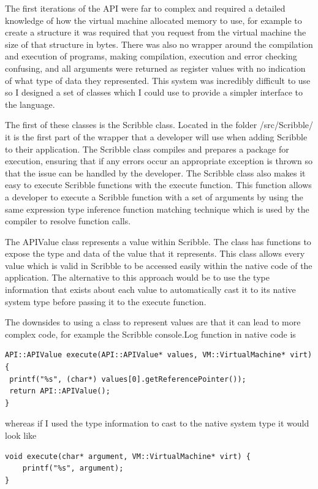 \documentclass[]{final_report}
\begin{document}
The first iterations of the API were far to complex and required a detailed knowledge of how the virtual machine allocated memory to use, for example to create a structure it was required that you request from the virtual machine the size of that structure in bytes. There was also no wrapper around the compilation and execution of programs, making compilation, execution and error checking confusing, and all arguments were returned as register values with no indication of what type of data they represented. This system was incredibly difficult to use so I designed a set of classes which I could use to provide a simpler interface to the language.

The first of these classes is the Scribble class. Located in the folder /src/Scribble/ it is the first part of the wrapper that a developer will use when adding Scribble to their application. The Scribble class compiles and prepares a package for execution, ensuring that if any errors occur an appropriate exception is thrown so that the issue can be handled by the developer. The Scribble class also makes it easy to execute Scribble functions with the execute function. This function allows a developer to execute a Scribble function with a set of arguments by using the same expression type inference function matching technique which is used by the compiler to resolve function calls.

The APIValue class represents a value within Scribble. The class has functions to expose the type and data of the value that it represents. This class allows every value which is valid in Scribble to be accessed easily within the native code of the application. The alternative to this approach would be to use the type information that exists about each value to automatically cast it to its native system type before passing it to the execute function.

The downsides to using a class to represent values are that it can lead to more complex code, for example the Scribble console.Log function in native code is 

\begin{verbatim}
API::APIValue execute(API::APIValue* values, VM::VirtualMachine* virt) {
 printf("%s", (char*) values[0].getReferencePointer());
 return API::APIValue();
}
\end{verbatim}

whereas if I used the type information to cast to the native system type it would look like

\begin{verbatim}
void execute(char* argument, VM::VirtualMachine* virt) {
	printf("%s", argument);
}
\end{verbatim}
\end{document}
